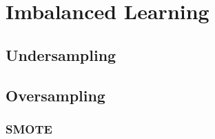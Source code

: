 \section{Imbalanced Learning}
\subsection{Undersampling}
\subsection{Oversampling}
\subsubsection{SMOTE}
